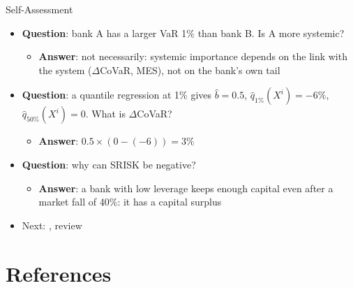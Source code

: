 \begin{frame}{Self-Assessment}
\itemsize{\small}
\begin{itemize}
    \item \textbf{Question}: bank A has a larger VaR 1\% than bank B. Is A more systemic?
    \begin{itemize}
        \item \textbf{Answer}: not necessarily: systemic importance depends on the link with the system ($\Delta$CoVaR, MES), not on the bank's own tail
    \end{itemize}
    \item \textbf{Question}: a quantile regression at 1\% gives $\hat b = 0.5$, $\hat q_{1\%}(X^i) = -6\%$, $\hat q_{50\%}(X^i) = 0$. What is $\Delta$CoVaR?
    \begin{itemize}
        \item \textbf{Answer}: $0.5 \times (0 - (-6)) = 3\%$
    \end{itemize}
    \item \textbf{Question}: why can SRISK be negative?
    \begin{itemize}
        \item \textbf{Answer}: a bank with low leverage keeps enough capital even after a market fall of 40\%: it has a capital surplus
    \end{itemize}
    \item Next: , review
\end{itemize}
\end{frame}


\section{References}

